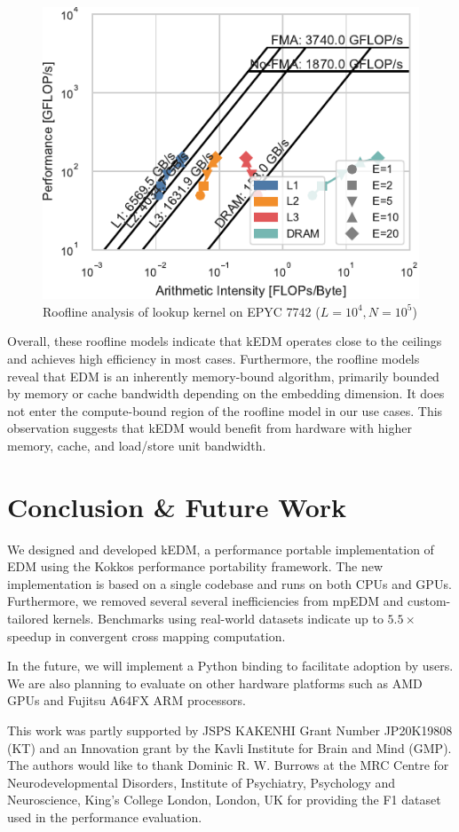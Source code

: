 \documentclass[sigconf]{acmart}
\begin{document}
\begin{figure}
    \centering
    \includegraphics[width=.90\linewidth]{figs/roofline_lookup_wo_rho_epyc}
    \caption{Roofline analysis of lookup kernel on EPYC 7742 ($L=10^4, N=10^5$)}%
    \label{fig:roofline-lookup-eypc}
\end{figure}

Overall, these roofline models indicate that kEDM operates close to the
ceilings and achieves high efficiency in most cases. Furthermore, the roofline
models reveal that EDM is an inherently memory-bound algorithm, primarily
bounded by memory or cache bandwidth depending on the embedding dimension. It
does not enter the compute-bound region of the roofline model in our use cases.
This observation suggests that kEDM would benefit from hardware with higher memory,
cache, and load/store unit bandwidth.

\section{Conclusion \& Future Work}\label{sec:conclusion}

We designed and developed kEDM, a performance portable implementation of EDM
using the Kokkos performance portability framework. The new implementation
is based on a single codebase and runs on both CPUs and GPUs. Furthermore, we removed several
several inefficiencies from mpEDM and custom-tailored kernels. Benchmarks using real-world datasets indicate up to $5.5\times$
speedup in convergent cross mapping computation.

In the future, we will implement a Python binding to facilitate adoption by
users. We are also planning to evaluate on other hardware platforms such as AMD GPUs and Fujitsu A64FX ARM processors.

\begin{acks}
This work was partly supported by JSPS KAKENHI Grant Number JP20K19808 (KT) and an
Innovation grant by the Kavli Institute for Brain and Mind (GMP). The authors would like to thank Dominic R. W. Burrows at the MRC Centre for Neurodevelopmental Disorders, Institute of Psychiatry, Psychology and Neuroscience, King's College London, London, UK for providing the F1 dataset used in the performance evaluation.
\end{acks}



\end{document}
